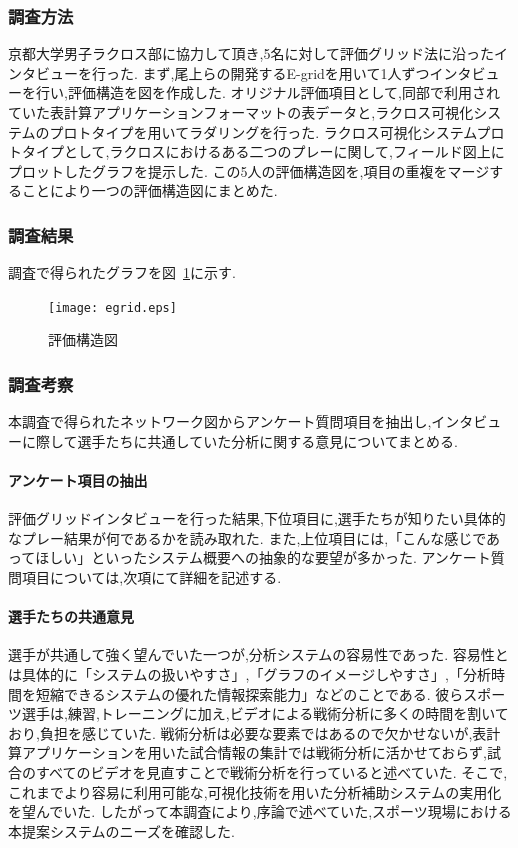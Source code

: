 \documentclass[sotsuron]{kuee}
\begin{document}
			\subsubsection{調査方法}
				京都大学男子ラクロス部に協力して頂き,5名に対して評価グリッド法に沿ったインタビューを行った.
				まず,尾上らの開発するE-gridを用いて1人ずつインタビューを行い,評価構造を図を作成した.
				オリジナル評価項目として,同部で利用されていた表計算アプリケーションフォーマットの表データと,ラクロス可視化システムのプロトタイプを用いてラダリングを行った.
				ラクロス可視化システムプロトタイプとして,ラクロスにおけるある二つのプレーに関して,フィールド図上にプロットしたグラフを提示した.
				この5人の評価構造図を,項目の重複をマージすることにより一つの評価構造図にまとめた.
			\subsubsection{調査結果}	
				調査で得られたグラフを図~\ref{fig:egrid}に示す.
					\begin{figure}
						\begin{center}
							\texttt{[image: egrid.eps]}
						\end{center}
						\caption{評価構造図}
				  		\label{fig:egrid}
					\end{figure}
			\subsubsection{調査考察}
				本調査で得られたネットワーク図からアンケート質問項目を抽出し,インタビューに際して選手たちに共通していた分析に関する意見についてまとめる.
				\paragraph{アンケート項目の抽出}
					評価グリッドインタビューを行った結果,下位項目に,選手たちが知りたい具体的なプレー結果が何であるかを読み取れた.
					また,上位項目には,「こんな感じであってほしい」といったシステム概要への抽象的な要望が多かった.
					アンケート質問項目については,次項にて詳細を記述する.
				\paragraph{選手たちの共通意見}
					選手が共通して強く望んでいた一つが,分析システムの容易性であった.
					容易性とは具体的に「システムの扱いやすさ」,「グラフのイメージしやすさ」,「分析時間を短縮できるシステムの優れた情報探索能力」などのことである.
					彼らスポーツ選手は,練習,トレーニングに加え,ビデオによる戦術分析に多くの時間を割いており,負担を感じていた.
					戦術分析は必要な要素ではあるので欠かせないが,表計算アプリケーションを用いた試合情報の集計では戦術分析に活かせておらず,試合のすべてのビデオを見直すことで戦術分析を行っていると述べていた.
					そこで,これまでより容易に利用可能な,可視化技術を用いた分析補助システムの実用化を望んでいた.
					したがって本調査により,序論で述べていた,スポーツ現場における本提案システムのニーズを確認した.
\end{document}
